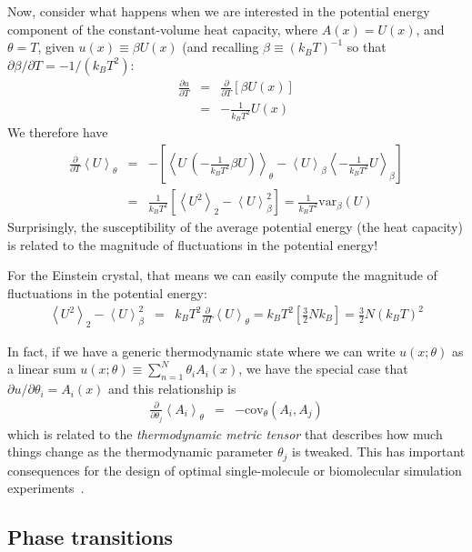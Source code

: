 \documentclass[english,course]{lecture}
\begin{document}
Now, consider what happens when we are interested in the potential energy component of the constant-volume heat capacity, where $A(x) = U(x)$, and $\theta = T$, given $u(x) \equiv \beta U(x)$ (and recalling $\beta \equiv (k_B T)^{-1}$ so that $\partial \beta / \partial T = - 1 / (k_B T^2)$:
\begin{eqnarray}
\frac{\partial u}{\partial T} &=& \frac{\partial}{\partial T} \left[ \beta U(x) \right] \\
&=& - \frac{1}{k_B T^2} U(x)
\end{eqnarray}
We therefore have
\begin{eqnarray}
\frac{\partial}{\partial T} \left< U \right>_\theta &=& - \left[ \left< U \, (-\frac{1}{k_B T^2} \beta U) \right>_\theta - \left< U \right>_\beta \left< -\frac{1}{k_B T^2} U \right>_\beta \right] \\
&=& \frac{1}{k_B T^2} \left[ \left< U^2 \right>_2 - \left<U\right>_\beta^2 \right] = \frac{1}{k_B T^2} \mathrm{var}_\beta(U)
\end{eqnarray}
Surprisingly, the susceptibility of the average potential energy (the heat capacity) is related to the magnitude of fluctuations in the potential energy!

For the Einstein crystal, that means we can easily compute the magnitude of fluctuations in the potential energy:
\begin{eqnarray}
\left< U^2 \right>_2 - \left<U\right>_\beta^2 &=& k_B T^2 \frac{\partial}{\partial T} \left< U \right>_\theta = k_B T^2 \left[ \frac{3}{2} N k_B \right] = \frac{3}{2} N (k_B T)^2
\end{eqnarray}

In fact, if we have a generic thermodynamic state where we can write $u(x;\theta)$ as a linear sum $u(x; \theta) \equiv \sum_{n=1}^N \theta_i A_i(x)$, we have the special case that $\partial u / \partial \theta_i = A_i(x)$ and this relationship is
\begin{eqnarray}
\frac{\partial}{\partial\theta_j} \left< A_i \right>_\theta &=& - \mathrm{cov}_\theta \left(A_i, A_j\right)
\end{eqnarray}
which is related to the \emph{thermodynamic metric tensor} that describes how much things change as the thermodynamic parameter $\theta_j$ is tweaked.
This has important consequences for the design of optimal single-molecule or biomolecular simulation experiments~\cite{crooks2007measuring}.

\subsection{Phase transitions}
\end{document}
